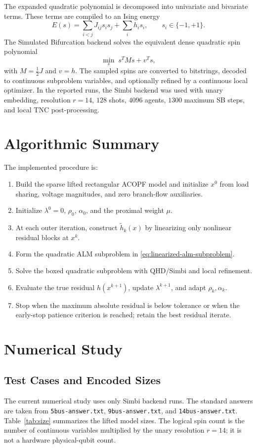 \documentclass[journal]{IEEEtran}
\begin{document}
The expanded quadratic polynomial is decomposed into univariate and bivariate terms. These terms are compiled to an Ising energy
\begin{equation}
    E(s)=\sum_{i<j}J_{ij}s_i s_j+\sum_i h_i s_i,\qquad s_i\in\{-1,+1\}.
\end{equation}
The Simulated Bifurcation backend solves the equivalent dense quadratic spin polynomial
\begin{equation}
    \min_s\; s^T M s+v^T s,
\end{equation}
with $M=\frac{1}{2}J$ and $v=h$. The sampled spins are converted to bitstrings, decoded to continuous subproblem variables, and optionally refined by a continuous local optimizer. In the reported runs, the Simbi backend was used with unary embedding, resolution $r=14$, $128$ shots, $4096$ agents, $1300$ maximum SB steps, and local TNC post-processing.

\section{Algorithmic Summary}
The implemented procedure is:
\begin{enumerate}
    \item Build the sparse lifted rectangular ACOPF model and initialize $x^0$ from load sharing, voltage magnitudes, and zero branch-flow auxiliaries.
    \item Initialize $\lambda^0=0$, $\rho_0$, $\alpha_0$, and the proximal weight $\mu$.
    \item At each outer iteration, construct $\widetilde h_k(x)$ by linearizing only nonlinear residual blocks at $x^k$.
    \item Form the quadratic ALM subproblem in \eqref{eq:linearized-alm-subproblem}.
    \item Solve the boxed quadratic subproblem with QHD/Simbi and local refinement.
    \item Evaluate the true residual $h(x^{k+1})$, update $\lambda^{k+1}$, and adapt $\rho_k,\alpha_k$.
    \item Stop when the maximum absolute residual is below tolerance or when the early-stop patience criterion is reached; retain the best residual iterate.
\end{enumerate}

\section{Numerical Study}
\subsection{Test Cases and Encoded Sizes}
The current numerical study uses only Simbi backend runs. The standard answers are taken from \texttt{5bus-answer.txt}, \texttt{9bus-answer.txt}, and \texttt{14bus-answer.txt}. Table~\ref{tab:size} summarizes the lifted model sizes. The logical spin count is the number of continuous variables multiplied by the unary resolution $r=14$; it is not a hardware physical-qubit count.
\end{document}
